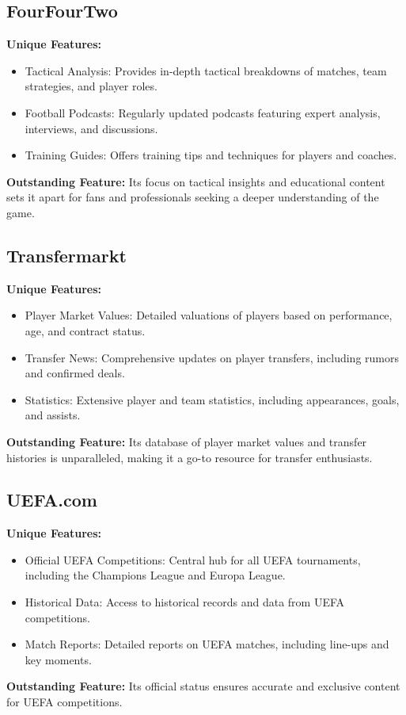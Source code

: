 \subsection{FourFourTwo}
\textbf{Unique Features:}
\begin{itemize}
    \item Tactical Analysis: Provides in-depth tactical breakdowns of matches, team strategies, and player roles.
    \item Football Podcasts: Regularly updated podcasts featuring expert analysis, interviews, and discussions.
    \item Training Guides: Offers training tips and techniques for players and coaches.
\end{itemize}
\textbf{Outstanding Feature:} Its focus on tactical insights and educational content sets it apart for fans and professionals seeking a deeper understanding of the game.

\subsection{Transfermarkt}
\textbf{Unique Features:}
\begin{itemize}
    \item Player Market Values: Detailed valuations of players based on performance, age, and contract status.
    \item Transfer News: Comprehensive updates on player transfers, including rumors and confirmed deals.
    \item Statistics: Extensive player and team statistics, including appearances, goals, and assists.
\end{itemize}
\textbf{Outstanding Feature:} Its database of player market values and transfer histories is unparalleled, making it a go-to resource for transfer enthusiasts.

\subsection{UEFA.com}
\textbf{Unique Features:}
\begin{itemize}
    \item Official UEFA Competitions: Central hub for all UEFA tournaments, including the Champions League and Europa League.
    \item Historical Data: Access to historical records and data from UEFA competitions.
    \item Match Reports: Detailed reports on UEFA matches, including line-ups and key moments.
\end{itemize}
\textbf{Outstanding Feature:} Its official status ensures accurate and exclusive content for UEFA competitions.

